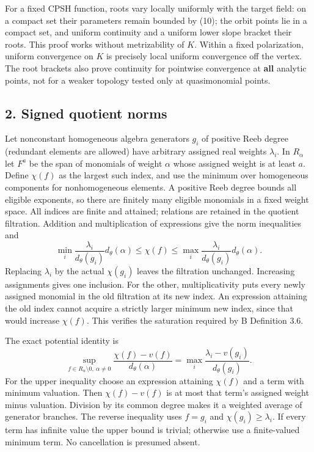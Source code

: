 \documentclass[
  10pt,
]{article}
\begin{document}
For a fixed CPSH function, roots vary locally uniformly with the target
field: on a compact set their parameters remain bounded by (10); the
orbit points lie in a compact set, and uniform continuity and a uniform
lower slope bracket their roots. This proof works without metrizability
of \(K\). Within a fixed polarization, uniform convergence on \(K\) is
precisely local uniform convergence off the vertex. The root brackets
also prove continuity for pointwise convergence at \textbf{all} analytic
points, not for a weaker topology tested only at quasimonomial points.

\subsection{2. Signed quotient norms}\label{signed-quotient-norms}

Let nonconstant homogeneous algebra generators \(g_i\) of positive Reeb
degree (redundant elements are allowed) have arbitrary assigned real
weights \(\lambda_i\). In \(R_\alpha\) let \(F^a\) be the span of
monomials of weight \(\alpha\) whose assigned weight is at least \(a\).
Define \(\chi(f)\) as the largest such index, and use the minimum over
homogeneous components for nonhomogeneous elements. A positive Reeb
degree bounds all eligible exponents, so there are finitely many
eligible monomials in a fixed weight space. All indices are finite and
attained; relations are retained in the quotient filtration. Addition
and multiplication of expressions give the norm inequalities and \[
 \min_i\frac{\lambda_i}{d_\theta(g_i)}d_\theta(\alpha)
 \leq\chi(f)\leq\max_i\frac{\lambda_i}{d_\theta(g_i)}d_\theta(\alpha).                            \tag{14}
\] Replacing \(\lambda_i\) by the actual \(\chi(g_i)\) leaves the
filtration unchanged. Increasing assignments gives one inclusion. For
the other, multiplicativity puts every newly assigned monomial in the
old filtration at its new index. An expression attaining the old index
cannot acquire a strictly larger minimum new index, since that would
increase \(\chi(f)\). This verifies the saturation required by B
Definition 3.6.

The exact potential identity is
\[ \sup_{f\in R_\alpha\setminus0,\ \alpha\ne0}\frac{\chi(f)-v(f)}{d_\theta(\alpha)}
       =\max_i\frac{\lambda_i-v(g_i)}{d_\theta(g_i)}.                                        \tag{15}\]
For the upper inequality choose an expression attaining \(\chi(f)\) and
a term with minimum valuation. Then \(\chi(f)-v(f)\) is at most that
term's assigned weight minus valuation. Division by its common degree
makes it a weighted average of generator branches. The reverse
inequality uses \(f=g_i\) and \(\chi(g_i)\geq\lambda_i\). If every term
has infinite value the upper bound is trivial; otherwise use a
finite-valued minimum term. No cancellation is presumed absent.
\end{document}
